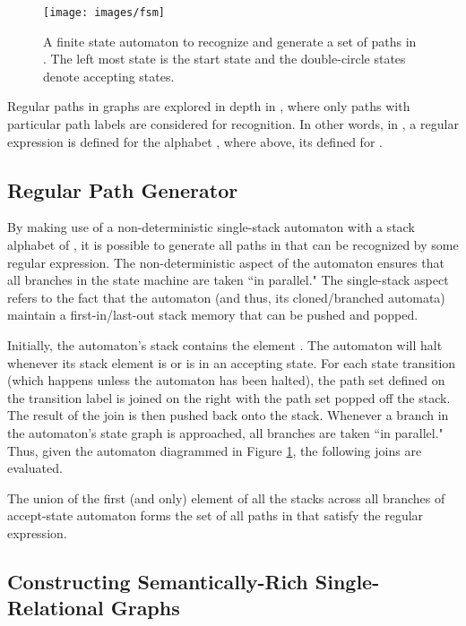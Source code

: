 \documentclass[10pt,conference,letterpaper]{IEEEtran}
\begin{document}
\begin{figure}[h!]
	\centering
	\texttt{[image: images/fsm]}
	 \caption{\label{fig:fsm} A finite state automaton to recognize and generate a set of paths in . The left most state is the start state and the double-circle states denote accepting states.}
\end{figure}

Regular paths in graphs are explored in depth in \cite{path:mendelzon1989}, where only paths with particular path labels are considered for recognition. In other words, in \cite{path:mendelzon1989}, a regular expression is defined for the alphabet , where above, its defined for .

\subsection{Regular Path Generator\label{sec:generator}}

By making use of a non-deterministic single-stack automaton with a stack alphabet of , it is possible to generate all paths in  that can be recognized by some regular expression. The non-deterministic aspect of the automaton ensures that all branches in the state machine are taken ``in parallel." The single-stack aspect refers to the fact that the automaton (and thus, its cloned/branched automata) maintain a first-in/last-out stack memory that can be pushed and popped.

Initially, the automaton's stack contains the element . The automaton will halt whenever its stack element is  or is in an accepting state. For each state transition (which happens unless the automaton has been halted), the path set defined on the transition label is joined on the right with the path set popped off the stack. The result of the join is then pushed back onto the stack. Whenever a branch in the automaton's state graph is approached, all branches are taken ``in parallel." Thus, given the automaton diagrammed in Figure \ref{fig:fsm}, the following joins are evaluated.

The union of the first (and only) element of all the stacks across all branches of accept-state automaton forms the set of all paths in  that satisfy the regular expression.

\subsection{Constructing Semantically-Rich Single-Relational Graphs\label{sec:rich}}
\end{document}
